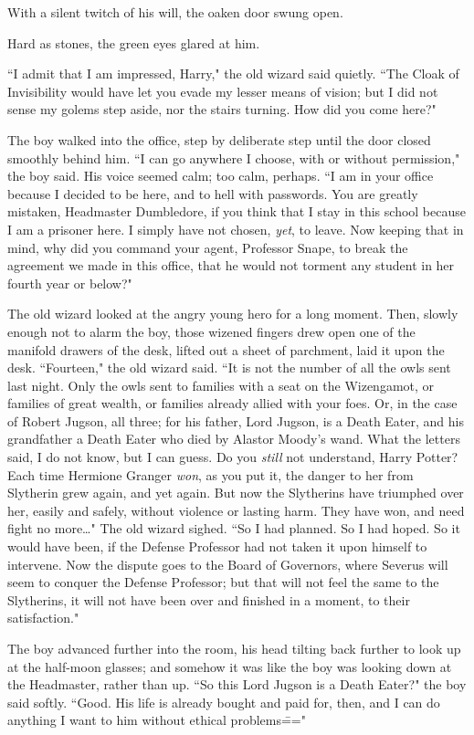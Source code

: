 With a silent twitch of his will, the oaken door swung open.

Hard as stones, the green eyes glared at him.

``I admit that I am impressed, Harry," the old wizard said quietly. ``The Cloak of Invisibility would have let you evade my lesser means of vision; but I did not sense my golems step aside, nor the stairs turning. How did you come here?"

The boy walked into the office, step by deliberate step until the door closed smoothly behind him. ``I can go anywhere I choose, with or without permission," the boy said. His voice seemed calm; too calm, perhaps. ``I am in your office because I decided to be here, and to hell with passwords. You are greatly mistaken, Headmaster Dumbledore, if you think that I stay in this school because I am a prisoner here. I simply have not chosen, \emph{yet}, to leave. Now keeping that in mind, why did you command your agent, Professor Snape, to break the agreement we made in this office, that he would not torment any student in her fourth year or below?"

The old wizard looked at the angry young hero for a long moment. Then, slowly enough not to alarm the boy, those wizened fingers drew open one of the manifold drawers of the desk, lifted out a sheet of parchment, laid it upon the desk. ``Fourteen," the old wizard said. ``It is not the number of all the owls sent last night. Only the owls sent to families with a seat on the Wizengamot, or families of great wealth, or families already allied with your foes. Or, in the case of Robert Jugson, all three; for his father, Lord Jugson, is a Death Eater, and his grandfather a Death Eater who died by Alastor Moody's wand. What the letters said, I do not know, but I can guess. Do you \emph{still} not understand, Harry Potter? Each time Hermione Granger \emph{won}, as you put it, the danger to her from Slytherin grew again, and yet again. But now the Slytherins have triumphed over her, easily and safely, without violence or lasting harm. They have won, and need fight no more{\ldots}" The old wizard sighed. ``So I had planned. So I had hoped. So it would have been, if the Defense Professor had not taken it upon himself to intervene. Now the dispute goes to the Board of Governors, where Severus will seem to conquer the Defense Professor; but that will not feel the same to the Slytherins, it will not have been over and finished in a moment, to their satisfaction."

The boy advanced further into the room, his head tilting back further to look up at the half-moon glasses; and somehow it was like the boy was looking down at the Headmaster, rather than up. ``So this Lord Jugson is a Death Eater?" the boy said softly. ``Good. His life is already bought and paid for, then, and I can do anything I want to him without ethical problems\==="

